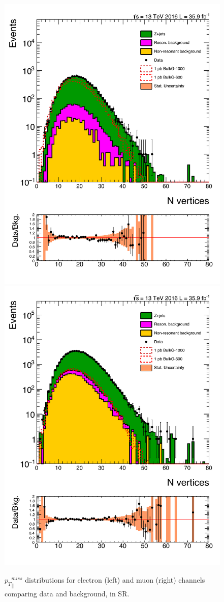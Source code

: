 \begin{figure}[htbp!]
\centering
\includegraphics[width=0.46\linewidth,page=22]{figures/ReMiniSummer16_DT_PhReMiniMCRcFixXsec_GMCPhPtWt_SRdPhiGT0p5_puWeightsummer16_muoneg_gjet_metfilter_unblind_el_log_1pb.pdf}
\includegraphics[width=0.46\linewidth,page=22]{figures/ReMiniSummer16_DT_PhReMiniMCRcFixXsec_GMCPhPtWt_SRdPhiGT0p5_puWeightsummer16_muoneg_gjet_metfilter_unblind_mu_log_1pb.pdf}
\caption{${p_{T}}^{miss}_\parallel$ distributions for electron (left) and muon (right)
channels comparing data and background, in SR.}
\label{fig:SR_gjet_metpara}
\end{figure}


